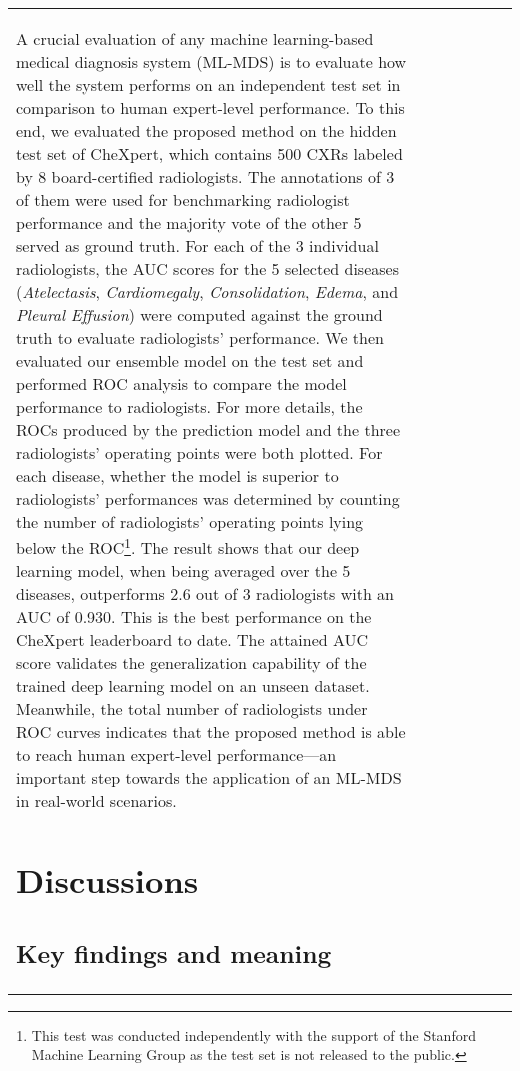 \documentclass[review]{elsarticle}
\begin{document}
\begin{frontmatter}
{\begin{table}
\begin{tabular}{p{2.25cm}p{1.3cm}p{1.3cm}p{1.2cm}p{1.2cm}p{1.3cm}p{0.9cm}}
A crucial evaluation of any machine learning-based medical diagnosis system (ML-MDS) is to evaluate how well the system performs on an independent test set in comparison to human expert-level performance. To this end, we evaluated the proposed method on the hidden test set of CheXpert, which contains 500 CXRs labeled by 8 board-certified radiologists. The annotations of 3 of them were used for benchmarking radiologist performance and the majority vote of the other 5 served as ground truth. For each of the 3 individual radiologists, the AUC scores for the 5 selected diseases (\textit{Atelectasis}, \textit{Cardiomegaly}, \textit{Consolidation}, \textit{Edema}, and \textit{Pleural Effusion}) were computed against the ground truth to evaluate radiologists' performance. We then evaluated our ensemble model on the test set and performed ROC analysis to compare the model performance to radiologists. For more details, the ROCs produced by the prediction model and the three radiologists' operating points were both plotted. For each disease, whether the model is superior to radiologists' performances was determined by counting the number of radiologists' operating points lying below the ROC\footnote{This test was conducted independently with the support of the Stanford Machine Learning Group as the test set is not released to the public.}. The result shows that our deep learning model, when being averaged over the 5 diseases, outperforms 2.6 out of 3 radiologists with an AUC of 0.930. This is the best performance on the CheXpert leaderboard to date. The attained AUC score validates the generalization capability of the trained deep learning model on an unseen dataset. Meanwhile, the total number of radiologists under ROC curves indicates that the proposed method is able to reach human expert-level performance---an important step towards the application of an ML-MDS in real-world scenarios.

\section{Discussions}
\label{sec:5}
\subsection{Key findings and meaning}


\end{tabular}
\end{table}}
\end{frontmatter}
\end{document}
